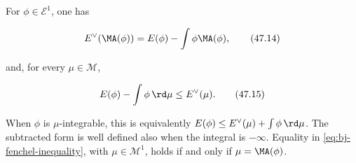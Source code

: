 \begin{proposition}\label{prop:bj-fenchel-equalities}
For $\phi\in\mathcal E^1$, one has

\[
 E^\vee(\MA(\phi))
  =E(\phi)-\int\phi\MA(\phi),
\tag{47.14}\label{eq:bj-dual-energy-ma}
\]

and, for every $\mu\in\mathcal M$,

\[
 E(\phi)-\int\phi\,\rd\mu\leq E^\vee(\mu).
\tag{47.15}\label{eq:bj-fenchel-inequality}
\]

When $\phi$ is $\mu$-integrable, this is equivalently
$E(\phi)\le E^\vee(\mu)+\int\phi\,\rd\mu$. The subtracted form is
well defined also when the integral is $-\infty$.
Equality in \eqref{eq:bj-fenchel-inequality}, with
$\mu\in\mathcal M^1$, holds if and only if $\mu=\MA(\phi)$.
\end{proposition}

